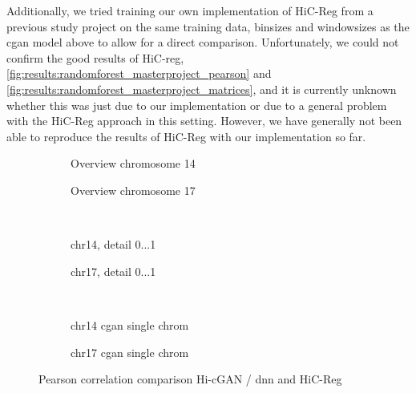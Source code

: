 Additionally, we tried training our own implementation of HiC-Reg from a previous study project \cite{Krauth2020} on the same training data, binsizes and windowsizes as the \acrshort{cgan} model above
to allow for a direct comparison. 
Unfortunately, we could not confirm the good results of HiC-reg, \cref{fig:results:randomforest_masterproject_pearson} and \ref{fig:results:randomforest_masterproject_matrices}, 
and it is currently unknown whether this was just due to our implementation or due to a general problem with the HiC-Reg approach in this setting.
However, we have generally not been able to reproduce the results of HiC-Reg with our implementation so far.

\begin{figure}[htbp]
 \begin{subfigure}{0.45\textwidth}
  \caption{Overview chromosome 14}\label{fig:results:zhang-vs-ours_pearson_14overview}
 \end{subfigure}\hfill
\begin{subfigure}{0.45\textwidth}
  \caption{Overview chromosome 17}\label{fig:results:zhang-vs-ours_pearson_17overview}
 \end{subfigure}\\[4mm]
 \begin{subfigure}{0.45\textwidth}
  \caption{chr14, detail 0...\SI{1}{\mega\bp}}\label{fig:results:zhang-vs-ours_pearson_14detail}
 \end{subfigure}\hfill
 \begin{subfigure}{0.45\textwidth}
  \caption{chr17, detail 0...\SI{1}{\mega\bp}}\label{fig:results:zhang-vs-ours_pearson_17detail}
 \end{subfigure}\\[4mm]
 \begin{subfigure}{0.45\textwidth}
    \caption{chr14 \acrshort{cgan} single chrom}\label{fig:results:zhang-vs-ours_pearson_14singlechrom}
 \end{subfigure}\hfill
 \begin{subfigure}{0.45\textwidth}
    \caption{chr17 \acrshort{cgan} single chrom}\label{fig:results:zhang-vs-ours_pearson_17singlechrom}
 \end{subfigure}
  \caption{Pearson correlation comparison Hi-cGAN / \acrshort{dnn} and HiC-Reg \cite{Zhang2019}} \label{fig:results:zhang-vs-ours_pearson}
\end{figure}

